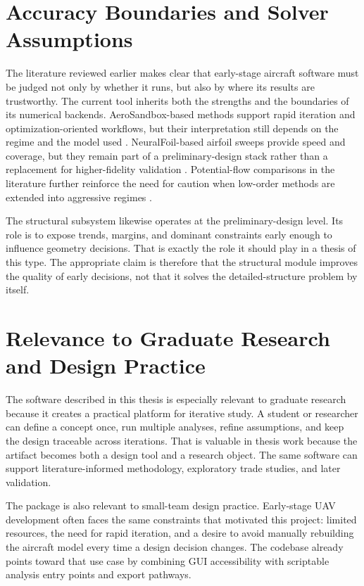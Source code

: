 \documentclass[12pt]{report}
\begin{document}
\section{Accuracy Boundaries and Solver Assumptions}
The literature reviewed earlier makes clear that early-stage aircraft software must be judged not only by whether it runs, but also by where its results are trustworthy. The current tool inherits both the strengths and the boundaries of its numerical backends. AeroSandbox-based methods support rapid iteration and optimization-oriented workflows, but their interpretation still depends on the regime and the model used \cite{Sharpe2021AeroSandbox,Sharpe2024Graph}. NeuralFoil-based airfoil sweeps provide speed and coverage, but they remain part of a preliminary-design stack rather than a replacement for higher-fidelity validation \cite{Sharpe2025NeuralFoil}. Potential-flow comparisons in the literature further reinforce the need for caution when low-order methods are extended into aggressive regimes \cite{Yu2022ICAS}.

The structural subsystem likewise operates at the preliminary-design level. Its role is to expose trends, margins, and dominant constraints early enough to influence geometry decisions. That is exactly the role it should play in a thesis of this type. The appropriate claim is therefore that the structural module improves the quality of early decisions, not that it solves the detailed-structure problem by itself.

\section{Relevance to Graduate Research and Design Practice}
The software described in this thesis is especially relevant to graduate research because it creates a practical platform for iterative study. A student or researcher can define a concept once, run multiple analyses, refine assumptions, and keep the design traceable across iterations. That is valuable in thesis work because the artifact becomes both a design tool and a research object. The same software can support literature-informed methodology, exploratory trade studies, and later validation.

The package is also relevant to small-team design practice. Early-stage UAV development often faces the same constraints that motivated this project: limited resources, the need for rapid iteration, and a desire to avoid manually rebuilding the aircraft model every time a design decision changes. The codebase already points toward that use case by combining GUI accessibility with scriptable analysis entry points and export pathways.
\end{document}
